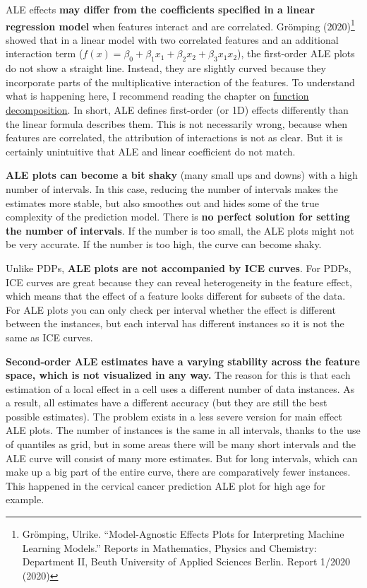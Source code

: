 \documentclass[
  12pt,
]{krantz}
\begin{document}
ALE effects \textbf{may differ from the coefficients specified in a linear regression model} when features interact and are correlated.
Grömping (2020)\footnote{Grömping, Ulrike. ``Model-Agnostic Effects Plots for Interpreting Machine Learning Models.'' Reports in Mathematics, Physics and Chemistry: Department II, Beuth University of Applied Sciences Berlin. Report 1/2020 (2020)} showed that in a linear model with two correlated features and an additional interaction term (\(f(x) = \beta_0 + \beta_1 x_1 + \beta_2 x_2 + \beta_3 x_1 x_2\)), the first-order ALE plots do not show a straight line.
Instead, they are slightly curved because they incorporate parts of the multiplicative interaction of the features.
To understand what is happening here, I recommend reading the chapter on \protect\hyperlink{decomposition}{function decomposition}.
In short, ALE defines first-order (or 1D) effects differently than the linear formula describes them.
This is not necessarily wrong, because when features are correlated, the attribution of interactions is not as clear.
But it is certainly unintuitive that ALE and linear coefficient do not match.

\textbf{ALE plots can become a bit shaky} (many small ups and downs) with a high number of intervals.
In this case, reducing the number of intervals makes the estimates more stable, but also smoothes out and hides some of the true complexity of the prediction model.
There is \textbf{no perfect solution for setting the number of intervals}.
If the number is too small, the ALE plots might not be very accurate.
If the number is too high, the curve can become shaky.

Unlike PDPs, \textbf{ALE plots are not accompanied by ICE curves}.
For PDPs, ICE curves are great because they can reveal heterogeneity in the feature effect, which means that the effect of a feature looks different for subsets of the data.
For ALE plots you can only check per interval whether the effect is different between the instances, but each interval has different instances so it is not the same as ICE curves.

\textbf{Second-order ALE estimates have a varying stability across the feature space, which is not visualized in any way.}
The reason for this is that each estimation of a local effect in a cell uses a different number of data instances.
As a result, all estimates have a different accuracy (but they are still the best possible estimates).
The problem exists in a less severe version for main effect ALE plots.
The number of instances is the same in all intervals, thanks to the use of quantiles as grid, but in some areas there will be many short intervals and the ALE curve will consist of many more estimates.
But for long intervals, which can make up a big part of the entire curve, there are comparatively fewer instances.
This happened in the cervical cancer prediction ALE plot for high age for example.
\end{document}
